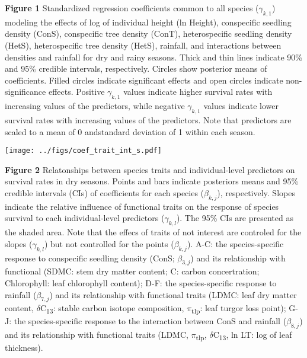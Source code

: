 \documentclass[
  12pt,
  letterpaper,
  DIV=11,
  numbers=noendperiod]{scrartcl}
\author{}
\date{}
\begin{document}
\ifdefined\Shaded\renewenvironment{Shaded}{\begin{tcolorbox}[boxrule=0pt, sharp corners, interior hidden, borderline west={3pt}{0pt}{shadecolor}, enhanced, breakable, frame hidden]}{\end{tcolorbox}}\fi

\textbf{Figure 1} Standardized regression coefficients common to all
species (\(\gamma_{k,1}\)) modeling the effects of log of individual
height (ln Height), conspecific seedling density (ConS), conspecific
tree density (ConT), heterospecific seedling density (HetS),
heterospecific tree density (HetS), rainfall, and interactions between
densities and rainfall for dry and rainy seasons. Thick and thin lines
indicate 90\% and 95\% credible intervals, respectively. Circles show
posterior means of coefficients. Filled circles indicate significant
effects and open circles indicate non-significance effects. Positive
\(\gamma_{k,1}\) values indicate higher survival rates with increasing
values of the predictors, while negative \(\gamma_{k,1}\) values
indicate lower survival rates with increasing values of the predictors.
Note that predictors are scaled to a mean of 0 andstandard deviation of
1 within each season.

\texttt{[image: ../figs/coef\_trait\_int\_s.pdf]}

\newpage

\textbf{Figure 2} Relatonships between species traits and
individual-level predictors on survival rates in dry seasons. Points and
bars indicate posteriors means and 95\% credible intervals (CIs) of
coefficients for each species (\(\beta_{k,j}\)), respectively. Slopes
indicate the relative influence of functional traits on the response of
species survival to each individual-level predictors (\(\gamma_{k,l}\)).
The 95\% CIs are presented as the shaded area. Note that the effecs of
traits of not interest are controled for the slopes (\(\gamma_{k,l}\))
but not controlled for the points (\(\beta_{k,j}\)). A-C: the
species-specific response to conspecific seedling density (ConS;
\(\beta_{3,j}\)) and its relationship with functional (SDMC: stem dry
matter content; C: carbon concertration; Chlorophyll: leaf chlorophyll
content); D-F: the species-specific response to rainfall
(\(\beta_{7,j}\)) and its relationship with functional traits (LDMC:
leaf dry matter content, \(\delta\)C\textsubscript{13}: stable carbon
isotope composition, \(\pi\)\textsubscript{tlp}: leaf turgor loss
point); G-J: the species-specific response to the interaction between
ConS and rainfall (\(\beta_{8,j}\)) and its relationship with functional
traits (LDMC, \(\pi\)\textsubscript{tlp}, \(\delta\)C\textsubscript{13},
ln LT: log of leaf thickness).
\end{document}
